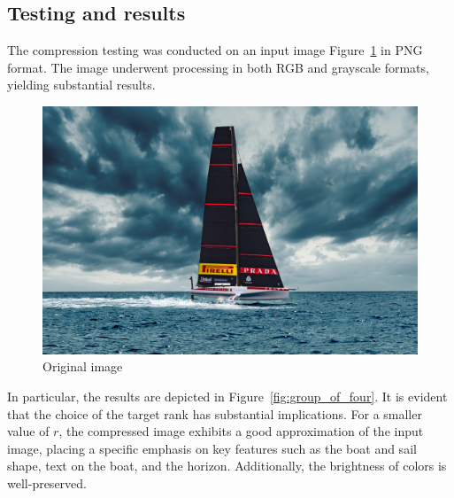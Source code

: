 \documentclass{article}
\begin{document}
\subsection{Testing and results}
The compression testing was conducted on an input image Figure~\ref{fig:Original_image} in PNG format. The image underwent processing in both RGB and grayscale formats, yielding substantial results.
\begin{figure}[h]
    \centering
    \includegraphics[width=0.4\linewidth]{luna_rossa.png}
    \caption{Original image}
    \label{fig:Original_image}
\end{figure}
In particular, the results are depicted in Figure~\ref{fig:group_of_four}. It is evident that the choice of the target rank has substantial implications. For a smaller value of \(r\), the compressed image exhibits a good approximation of the input image, placing a specific emphasis on key features such as the boat and sail shape, text on the boat, and the horizon. Additionally, the brightness of colors is well-preserved.
\end{document}
